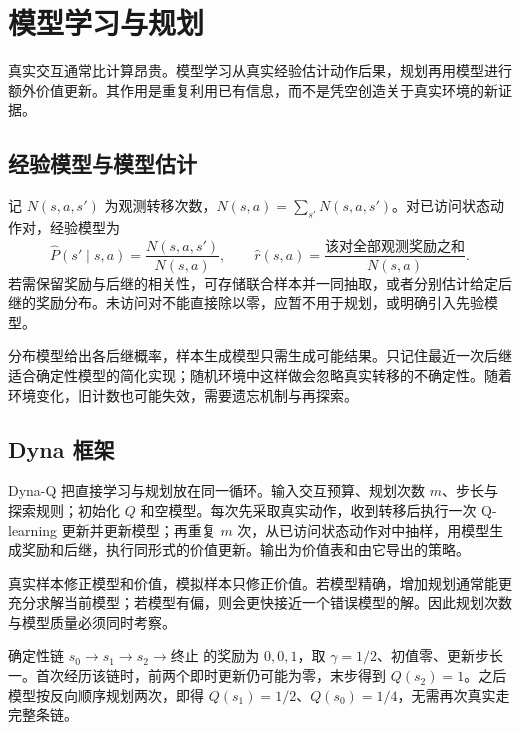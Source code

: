 \setcounter{chapter}{10} %
\chapter{模型学习与规划}
\label{ch:rl-planning}

真实交互通常比计算昂贵。模型学习从真实经验估计动作后果，规划再用模型进行额外价值更新。其作用是重复利用已有信息，而不是凭空创造关于真实环境的新证据。

\section{经验模型与模型估计}

记 $N(s,a,s')$ 为观测转移次数，$N(s,a)=\sum_{s'}N(s,a,s')$。对已访问状态动作对，经验模型为
\[
\widehat P(s'\mid s,a)=\frac{N(s,a,s')}{N(s,a)},\qquad
\widehat r(s,a)=\frac{\text{该对全部观测奖励之和}}{N(s,a)}.
\]
若需保留奖励与后继的相关性，可存储联合样本并一同抽取，或者分别估计给定后继的奖励分布。未访问对不能直接除以零，应暂不用于规划，或明确引入先验模型。

分布模型给出各后继概率，样本生成模型只需生成可能结果。只记住最近一次后继适合确定性模型的简化实现；随机环境中这样做会忽略真实转移的不确定性。随着环境变化，旧计数也可能失效，需要遗忘机制与再探索。

\section{Dyna 框架}

Dyna-Q 把直接学习与规划放在同一循环。输入交互预算、规划次数 $m$、步长与探索规则；初始化 $Q$ 和空模型。每次先采取真实动作，收到转移后执行一次 Q-learning 更新并更新模型；再重复 $m$ 次，从已访问状态动作对中抽样，用模型生成奖励和后继，执行同形式的价值更新。输出为价值表和由它导出的策略。

真实样本修正模型和价值，模拟样本只修正价值。若模型精确，增加规划通常能更充分求解当前模型；若模型有偏，则会更快接近一个错误模型的解。因此规划次数与模型质量必须同时考察。

\begin{example}[把终点奖励向前传播]
确定性链 $s_0\to s_1\to s_2\to\text{终止}$ 的奖励为 $0,0,1$，取 $\gamma=1/2$、初值零、更新步长一。首次经历该链时，前两个即时更新仍可能为零，末步得到 $Q(s_2)=1$。之后模型按反向顺序规划两次，即得 $Q(s_1)=1/2$、$Q(s_0)=1/4$，无需再次真实走完整条链。
\end{example}

